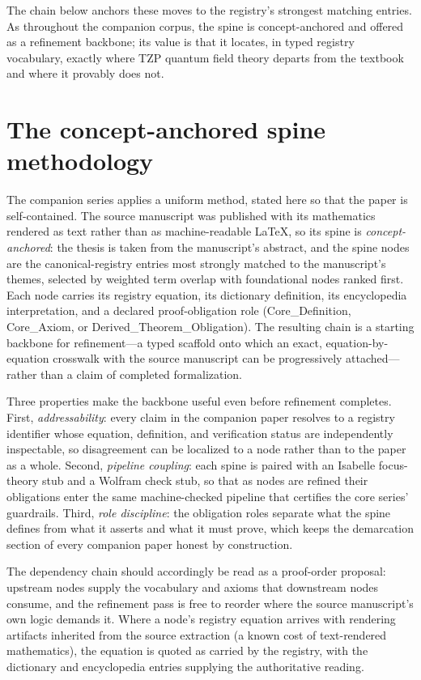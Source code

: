 \documentclass[11pt]{article}
\theoremstyle{remark}
\begin{document}
The chain below anchors these moves to the registry's strongest matching entries. As throughout the companion corpus, the spine is concept-anchored and offered as a refinement backbone; its value is that it locates, in typed registry vocabulary, exactly where TZP quantum field theory departs from the textbook and where it provably does not.

\section{The concept-anchored spine methodology}
\label{sec:method}

The companion series applies a uniform method, stated here so that the paper is self-contained. The source manuscript was published with its mathematics rendered as text rather than as machine-readable LaTeX, so its spine is \emph{concept-anchored}: the thesis is taken from the manuscript's abstract, and the spine nodes are the canonical-registry entries most strongly matched to the manuscript's themes, selected by weighted term overlap with foundational nodes ranked first. Each node carries its registry equation, its dictionary definition, its encyclopedia interpretation, and a declared proof-obligation role (Core\_Definition, Core\_Axiom, or Derived\_Theorem\_Obligation). The resulting chain is a starting backbone for refinement---a typed scaffold onto which an exact, equation-by-equation crosswalk with the source manuscript can be progressively attached---rather than a claim of completed formalization.

Three properties make the backbone useful even before refinement completes. First, \emph{addressability}: every claim in the companion paper resolves to a registry identifier whose equation, definition, and verification status are independently inspectable, so disagreement can be localized to a node rather than to the paper as a whole. Second, \emph{pipeline coupling}: each spine is paired with an Isabelle focus-theory stub and a Wolfram check stub, so that as nodes are refined their obligations enter the same machine-checked pipeline that certifies the core series' guardrails. Third, \emph{role discipline}: the obligation roles separate what the spine defines from what it asserts and what it must prove, which keeps the demarcation section of every companion paper honest by construction.

The dependency chain should accordingly be read as a proof-order proposal: upstream nodes supply the vocabulary and axioms that downstream nodes consume, and the refinement pass is free to reorder where the source manuscript's own logic demands it. Where a node's registry equation arrives with rendering artifacts inherited from the source extraction (a known cost of text-rendered mathematics), the equation is quoted as carried by the registry, with the dictionary and encyclopedia entries supplying the authoritative reading.
\end{document}
